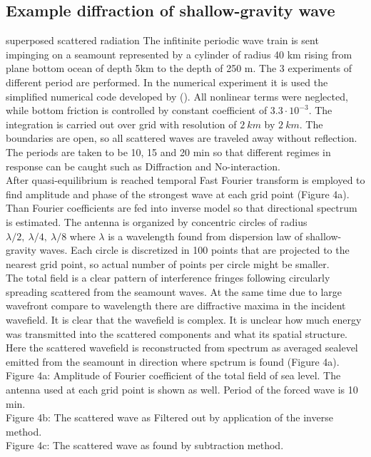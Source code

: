 \subsection{Example diffraction of shallow-gravity wave}
superposed scattered radiation
The infitinite periodic wave train is sent impinging on a seamount represented by a cylinder of 
radius 40 km rising from plane bottom ocean of depth 5km to the depth of 250 m. The 3 experiments 
of different period are performed. In the numerical experiment it is used the simplified numerical 
code developed by (\cite{kowalik2005numerical}). All nonlinear terms were neglected, while bottom 
friction is controlled by constant coefficient of $3.3 \cdot 10^{-3}$. The integration is carried 
out over grid with resolution of $2~km$ by $2~km$. The boundaries are open, so all scattered waves 
are traveled away without reflection. The periods are taken to be 10, 15 and 20 min so 
that different regimes in response can be caught such as Diffraction and No-interaction.\\
After quasi-equilibrium is reached temporal Fast Fourier transform is employed to find amplitude 
and phase of the strongest wave at each grid point (Figure 4a). Than Fourier coefficients are fed 
into inverse model so that directional spectrum is estimated. The antenna is organized by 
concentric circles of radius $ \lambda/2,~\lambda/4,~\lambda/8 $ where $ \lambda $ is a wavelength 
found from dispersion law of shallow-gravity waves. Each circle is discretized in 100 points that 
are projected to the nearest grid point, so actual number of points per circle might be smaller.\\
The total field is a clear pattern of interference fringes following circularly spreading scattered 
from the seamount waves. At the same time due to large wavefront compare to wavelength there are 
diffractive maxima in the incident wavefield. It is clear that the wavefield is complex. It is 
unclear how much energy was transmitted into the scattered components and what its spatial 
structure. Here the scattered wavefield is reconstructed from spectrum as averaged sealevel emitted 
from the seamount in direction where spctrum is found (Figure 4a).\\

Figure 4a: Amplitude of Fourier coefficient of the total field of sea level. The antenna used at 
each grid point is shown as well. Period of the forced wave is 10 min.\\
Figure 4b: The scattered wave as Filtered out by application of the inverse method.\\
Figure 4c: The scattered wave as found by subtraction method.\\


